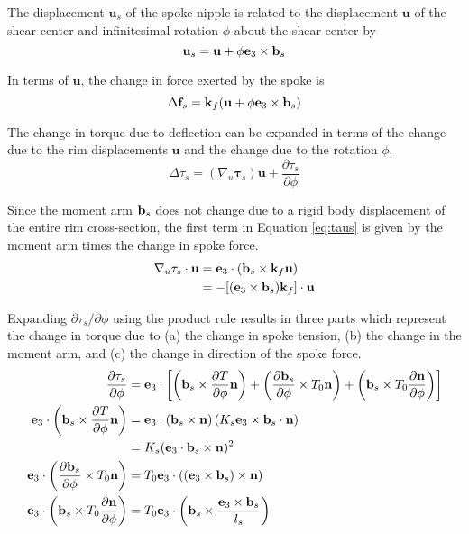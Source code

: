 \documentclass[\rootdir/thesis.tex]{subfiles}
\begin{document}
The displacement $\mathbf{u}_s$ of the spoke nipple is related to the displacement $\mathbf{u}$ of the shear center and infinitesimal rotation $\phi$ about the shear center by
\begin{equation}
\label{eq:u_s}
\mathbf{u}_s = \mathbf{u} + \phi\mathbf{e}_3 \times \mathbf{b}_s
\end{equation}

In terms of $\mathbf{u}$, the change in force exerted by the spoke is
\begin{equation}
\label{eq:fs_u}
\Delta \mathbf{f}_s= \mathbf{k}_f (\mathbf{u} + \phi\mathbf{e}_3\times\mathbf{b}_s)
\end{equation}

The change in torque due to deflection can be expanded in terms of the change due to the rim displacements $\mathbf{u}$ and the change due to the rotation $\phi$.
\begin{equation}
\label{eq:taus}
\Delta\tau_s = (\nabla_u\mathbf{\tau}_s) \mathbf{u} +
    \frac{\partial\tau_s}{\partial\phi}
\end{equation}

Since the moment arm $\mathbf{b}_s$ does not change due to a rigid body displacement of the entire rim cross-section, the first term in Equation \eqref{eq:taus} is given by the moment arm times the change in spoke force.
\begin{align}
\label{eq:taus_del}
\begin{split}
\nabla_u\tau_s\cdot\mathbf{u} &= \mathbf{e}_3\cdot (\mathbf{b}_s\times\mathbf{k}_f \mathbf{u})\\
    &= -[(\mathbf{e}_3\times\mathbf{b}_s) \mathbf{k}_f]\cdot\mathbf{u}
\end{split}
\end{align}

Expanding $\partial\tau_s/\partial\phi$ using the product rule results in three parts which represent the change in torque due to (a) the change in spoke tension, (b) the change in the moment arm, and (c) the change in direction of the spoke force.
\begin{align}
\label{eq:taus_part}
\begin{split}
\frac{\partial\tau_s}{\partial\phi} &= \mathbf{e}_3\cdot \left[
    \left(\mathbf{b}_s\times \frac{\partial T}{\partial\phi}\mathbf{n}\right) +
    \left( \frac{\partial\mathbf{b}_s}{\partial\phi} \times T_0\mathbf{n} \right) +
    \left( \mathbf{b}_s \times T_0 \frac{\partial\mathbf{n}}{\partial\phi} \right) \right]\\
\mathbf{e}_3\cdot\left(\mathbf{b}_s\times \frac{\partial T}{\partial\phi}\mathbf{n}\right) &=
    \mathbf{e}_3\cdot(\mathbf{b}_s\times\mathbf{n})\left(K_s\mathbf{e}_3\times\mathbf{b}_s\cdot\mathbf{n}\right)\\
    &= K_s(\mathbf{e}_3\cdot\mathbf{b}_s\times\mathbf{n})^2\\
\mathbf{e}_3\cdot\left( \frac{\partial\mathbf{b}_s}{\partial\phi} \times T_0\mathbf{n} \right) &=
    T_0\mathbf{e}_3\cdot((\mathbf{e}_3\times\mathbf{b}_s)\times\mathbf{n})\\
\mathbf{e}_3\cdot\left( \mathbf{b}_s \times T_0 \frac{\partial\mathbf{n}}{\partial\phi} \right) &=
    T_0\mathbf{e}_3\cdot\left(\mathbf{b}_s \times \frac{\mathbf{e}_3\times\mathbf{b}_s}{l_s} \right)
\end{split}
\end{align}
\end{document}
